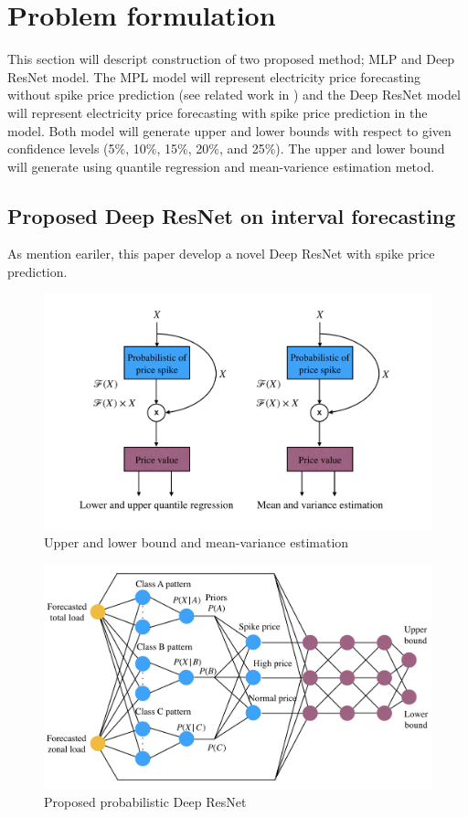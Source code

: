 \documentclass[review]{elsarticle}
\begin{document}
\section{Problem formulation}
  This section will descript construction of two proposed method; MLP and Deep ResNet model. The MPL model will represent electricity price forecasting without spike price prediction (see related work in \cite{Dudek2016}) and the Deep ResNet model will represent electricity price forecasting with spike price prediction in the model. Both model will generate upper and lower bounds with respect to given confidence levels (5$\%$, 10$\%$, 15$\%$, 20$\%$, and 25$\%$). The upper and lower bound will generate using quantile regression and mean-varience estimation metod.

  \subsection{Proposed Deep ResNet on interval forecasting}
    As mention eariler, this paper develop a novel Deep ResNet with spike price prediction.

    \begin{figure}[H]
      \caption{Upper and lower bound and mean-variance estimation}
      \label{Fig:UB_LB_MV_PDRNN}
      \includegraphics[width=12cm]{UB_LB_MV_PDRNN}
    \centering
    \end{figure}

    \begin{figure}[H]
      \caption{Proposed probabilistic Deep ResNet}
      \label{Fig:proposed_PDRNN}
      \includegraphics[width=12cm]{proposed_PDRNN}
    \centering
    \end{figure}
\end{document}
